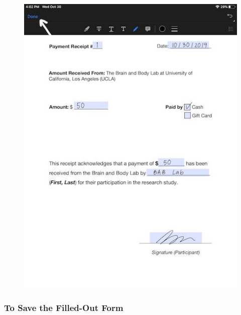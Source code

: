 \documentclass[]{book}
\begin{document}
\begin{itemize}
  \begin{figure}
  \centering
  \includegraphics{images/payment/6.jpeg}
  \caption{}
  \end{figure}
\end{itemize}

\hypertarget{to-save-the-filled-out-form}{%
\subsubsection{To Save the Filled-Out Form}\label{to-save-the-filled-out-form}}
\end{document}
